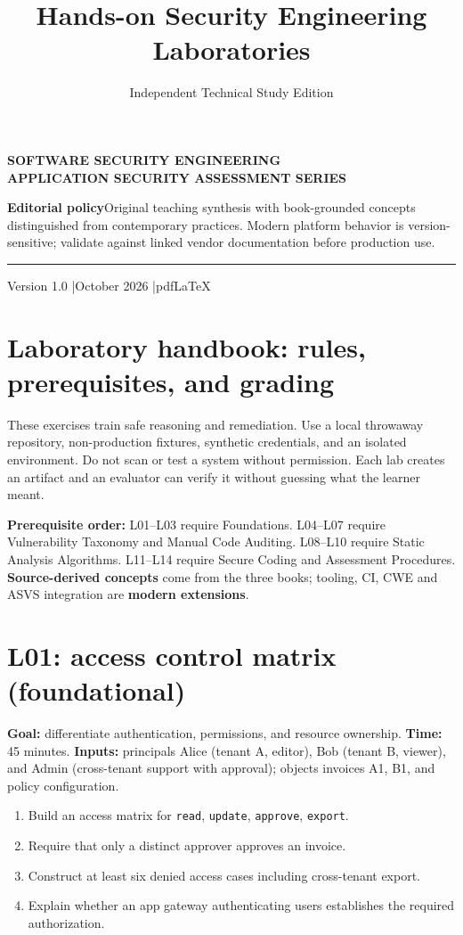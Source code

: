 \documentclass[
  letterpaper,
]{article}
\title{Hands-on Security Engineering Laboratories}
\author{Independent Technical Study Edition}
\date{}
\makeatletter
\providecommand{\tightlist}{%
  \setlength{\itemsep}{0pt}\setlength{\parskip}{0pt}}
\renewcommand{\maketitle}{%
 \hypersetup{pageanchor=false}%
\begin{titlepage}\thispagestyle{empty}
 \vspace*{1.5cm}{\color{brand}\rule{\textwidth}{3pt}}\par\vspace{1cm}
 {\sffamily\bfseries\color{muted}\large SOFTWARE SECURITY ENGINEERING\\ APPLICATION SECURITY ASSESSMENT SERIES}\par\vspace{1.05cm}
 {\sffamily\bfseries\color{ink}\fontsize{27}{34}\selectfont\@title\par}\vspace{0.8cm}
 {\sffamily\large\color{brand}\@author\par}\vfill
 \begin{tcolorbox}[colback=brandlight,colframe=brand!55,boxrule=0.5pt]
 \small\textbf{Editorial policy}\quad Original teaching synthesis with book-grounded concepts distinguished from contemporary practices. Modern platform behavior is version-sensitive; validate against linked vendor documentation before production use.
 \end{tcolorbox}
 {\color{brand}\rule{\textwidth}{2pt}}\par\vspace{0.3cm}
 {\sffamily\small Version 1.0 \quad|\quad October 2026 \quad|\quad pdfLaTeX}\end{titlepage}\hypersetup{pageanchor=true}\setcounter{page}{1}}
\makeatother
\begin{document}
\maketitle

{
\setcounter{tocdepth}{3}
\tableofcontents
}
\section{Laboratory handbook: rules, prerequisites, and
grading}\label{laboratory-handbook-rules-prerequisites-and-grading}

These exercises train safe reasoning and remediation. Use a local
throwaway repository, non-production fixtures, synthetic credentials,
and an isolated environment. Do not scan or test a system without
permission. Each lab creates an artifact and an evaluator can verify it
without guessing what the learner meant.

\textbf{Prerequisite order:} L01--L03 require Foundations. L04--L07
require Vulnerability Taxonomy and Manual Code Auditing. L08--L10
require Static Analysis Algorithms. L11--L14 require Secure Coding and
Assessment Procedures. \textbf{Source-derived concepts} come from the
three books; tooling, CI, CWE and ASVS integration are \textbf{modern
extensions}.

\section{L01: access control matrix
(foundational)}\label{l01-access-control-matrix-foundational}

\textbf{Goal:} differentiate authentication, permissions, and resource
ownership. \textbf{Time:} 45 minutes. \textbf{Inputs:} principals Alice
(tenant A, editor), Bob (tenant B, viewer), and Admin (cross-tenant
support with approval); objects invoices A1, B1, and policy
configuration.

\begin{enumerate}
\def\labelenumi{\arabic{enumi}.}
\tightlist
\item
  Build an access matrix for \texttt{read}, \texttt{update},
  \texttt{approve}, \texttt{export}.
\item
  Require that only a distinct approver approves an invoice.
\item
  Construct at least six denied access cases including cross-tenant
  export.
\item
  Explain whether an app gateway authenticating users establishes the
  required authorization.
\end{enumerate}
\end{document}
